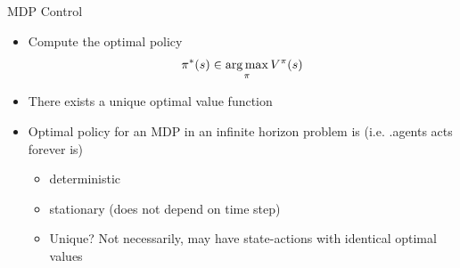 \begin{frame}[c]{MDP Control}

\begin{itemize}
	\item Compute the optimal policy
	$$ \pi^*(s)  \in \operatorname*{arg\,max}_\pi V^\pi(s)$$
	\item There \alert{exists a unique optimal value function}
	\item Optimal policy for an MDP in an infinite horizon problem is \newline (i.e. .agents acts forever is)
	\begin{itemize}
		\item  deterministic
		\item stationary (does not depend on time step)
		\item Unique? Not necessarily, may have state-actions with identical optimal values
	\end{itemize}
\end{itemize}

\end{frame}



